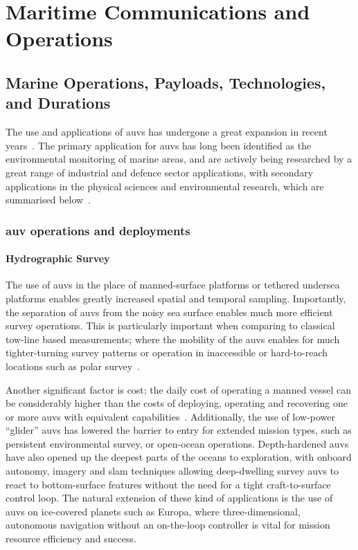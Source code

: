 \chapter{Maritime Communications and Operations}
\label{ch:maritime_background}

\section{Marine Operations, Payloads, Technologies, and Durations}\label{sec:marine_ops}

The use and applications of \glspl{auv} has undergone a great expansion in recent years~\cite{Alam2014}.
The primary application for \glspl{auv} has long been identified as the environmental monitoring of marine areas, and are actively being researched by a great range of industrial and defence sector applications, with secondary applications in the physical sciences and environmental research, which are summarised below~\cite{Bingham2002,Wynn2014}.

\subsection{\gls{auv} operations and deployments}

\subsubsection{Hydrographic Survey}

The use of \glspl{auv} in the place of manned-surface platforms or tethered undersea platforms enables greatly increased spatial and temporal sampling.
Importantly, the separation of \glspl{auv} from the noisy sea surface enables much more efficient survey operations.
This is particularly important when comparing to classical tow-line based measurements; where the mobility of the \glspl{auv} enables for much tighter-turning survey patterns or operation in inaccessible or hard-to-reach locations such as polar survey~\cite{Curtin1993}.

Another significant factor is cost; the daily cost of operating a manned vessel can be considerably higher than the costs of deploying, operating and recovering one or more \glspl{auv} with equivalent capabilities~\cite{Nicholson2008}.
Additionally, the use of low-power ``glider'' \glspl{auv} has lowered the barrier to entry for extended mission types, such as persistent environmental survey, or open-ocean operations. 
Depth-hardened \glspl{auv} have also opened up the deepest parts of the oceans to exploration, with onboard autonomy, imagery and \gls{slam} techniques allowing deep-dwelling survey \glspl{auv} to react to bottom-surface features without the need for a tight craft-to-surface control loop.
The natural extension of these kind of applications is the use of \glspl{auv} on ice-covered planets such as Europa, where three-dimensional, autonomous navigation without an on-the-loop controller is vital for mission resource efficiency and success.

